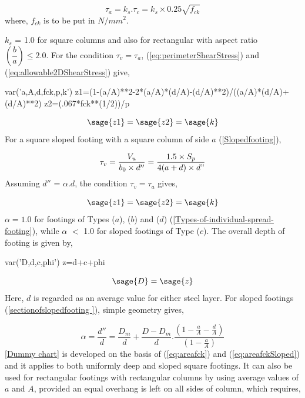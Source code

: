 
\begin{equation}
\label{eq:allowable2DShearStress}
\tau_{a} = k_{s} . \tau_{c} = k_{s} \times 0.25 \sqrt{f_{ck}}
\end{equation}
where, $f_{ck}$ is to be put in $N/mm^2$.

$k_{s}$ = 1.0 for square columns and also for rectangular with aspect ratio
$\left( \dfrac{b}{a} \right) \leq {2.0}$. For the condition $\tau_{v} =
\tau_{a}$, \equmacro (\ref{eq:perimeterShearStress}) and
(\ref{eq:allowable2DShearStress}) give,

\begin{sagesilent}
  var('a,A,d,fck,p,k')
  z1=(1-(a/A)**2-2*(a/A)*(d/A)-(d/A)**2)/((a/A)*(d/A)+(d/A)**2)
  z2=(.067*fck**(1/2))/p
\end{sagesilent}

\begin{equation}
  \label{eq:areafck}
  \sage{z1}=\sage{z2}=\sage{k}
\end{equation}
For a square sloped footing with a square column of side $a$ (\figmacro \ref{Slopedfooting}),
 
\begin{equation}
\label{eq:shearSquare}
\tau_{v} = \frac{V_{u}}{b_{0} \times d''}
=\frac{1.5 \times {S_p}}{4(a + d) \times d"}
\end{equation}
Assuming $d''$ = $ \alpha . d $, the condition $\tau_{v} = \tau_{a}$ gives,

\begin{equation} 
 \label{eq:areafckSloped}
  \sage{z1}=\sage{z2}=\sage{k}                                   
\end{equation} 
$\alpha = 1.0$ for footings of Types ($a$), ($b$) and ($d$) (\figmacro \ref{Types-of-individual-spread-footing}),
while $\alpha$ $<$ 1.0 for sloped footings of Type ($c$). The overall depth
of footing is given by,

\begin{sagesilent}
  var('D,d,c,phi')
  z=d+c+phi
\end{sagesilent}

\begin{equation}
  \label{eq:depth-cover}
  \sage{D}=\sage{z}
\end{equation}
Here, $d$ is regarded as an average value for either steel layer. For sloped
footings  (\figmacro \ref{sectionofslopedfooting }), simple geometry gives,

\begin{equation}
\label{eq:shape}
\alpha = \frac{d''}{d} = \frac{{D_m}}{d} + \frac{D - {D_m}}{d}.
\frac{\left(1 - \frac{a}{A} - \frac{d}{A}\right)}
{\left(1 - \frac{a}{A}\right)}
\end{equation}
\chartmacro \ref{Dummy chart} is developed on the basis of \equmacro (\ref{eq:areafck}) and (\ref{eq:areafckSloped}) and it
applies to both uniformly deep and sloped square footings. It can also be
used for rectangular footings with rectangular columns by using average
values of $a$ and $A$, provided an equal overhang is left on all sides of
column, which requires,

